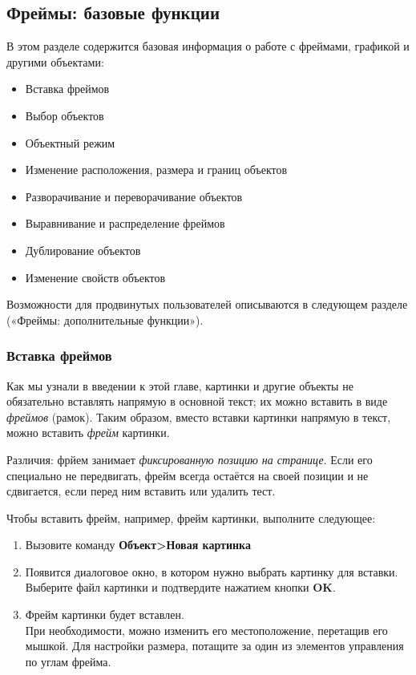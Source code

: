 \documentclass[a4paper,10pt]{article}
\begin{document}
\subsection{Фреймы: базовые функции}
В этом разделе содержится базовая информация о работе с фреймами, графикой и другими объектами:

\begin{itemize}
 \item Вставка фреймов
 \item Выбор объектов
 \item Объектный режим
 \item Изменение расположения, размера и границ объектов
 \item Разворачивание и переворачивание объектов
 \item Выравнивание и распределение фреймов
 \item Дублирование объектов
 \item Изменение свойств объектов
\end{itemize}

Возможности для продвинутых пользователей описываются в следующем разделе («Фреймы: дополнительные функции»).

\subsubsection{Вставка фреймов}
Как мы узнали в введении к этой главе, картинки и другие объекты не обязательно вставлять напрямую в основной текст; их можно вставить в виде \textit{фреймов} (рамок). Таким образом, вместо вставки картинки напрямую в текст, можно вставить \textit{фрейм} картинки.

Различия: фрйем занимает \textit{фиксированную позицию на странице}. Если его специально не передвигать, фрейм всегда остаётся на своей позиции и не сдвигается, если перед ним вставить или удалить тест.

Чтобы вставить фрейм, например, фрейм картинки, выполните следующее:

\begin{enumerate}
 \item Вызовите команду \textbf{Объект>Новая картинка}
 \item Появится диалоговое окно, в котором нужно выбрать картинку для вставки. Выберите файл картинки и подтвердите нажатием кнопки \textbf{OK}.
 \item Фрейм картинки будет вставлен.\\
 При необходимости, можно изменить его местоположение, перетащив его мышкой. Для настройки размера, потащите за один из элементов управления по углам фрейма.
\end{enumerate}
\end{document}
